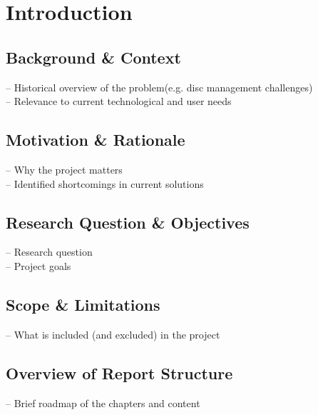 \section{Introduction}

\subsection{Background \& Context}
– Historical overview of the problem(e.g. disc management challenges)\\
– Relevance to current technological and user needs
\subsection{Motivation \& Rationale}
– Why the project matters\\
– Identified shortcomings in current solutions
\subsection{Research Question \& Objectives}
– Research question \\
– Project goals
\subsection{Scope \& Limitations}
– What is included (and excluded) in the project \\
\subsection{Overview of Report Structure}
– Brief roadmap of the chapters and content